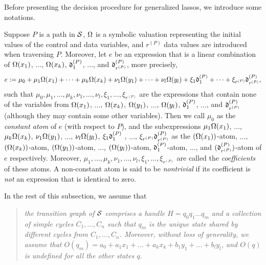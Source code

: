 Before presenting the decision procedure for generalized lassos, we introduce some notations.

Suppose $P$ is a path in ${\mathcal{S} }$, $\Omega$ is a symbolic valuation representing the initial values of the control and data variables, and $r^{(P)}$ data values are introduced when traversing $P$. Moreover, let $e$ be an expression that is a linear combination of $\Omega(x_1)$, $\dots$, $\Omega(x_k)$, $\mathfrak{d}^{(P)}_1$, $\dots$, and $\mathfrak{d}^{(P)}_{r^{(P)}}$, more precisely, 
\[e:=\mu_0 + \mu_1 \Omega(x_1) +\dots + \mu_k \Omega(x_k) + \nu_1 \Omega(y_1)+\dots + \nu_l \Omega(y_l)+ \xi_1 \mathfrak{d}^{(P)}_{1} + \dots + \xi_{r^{(P)}} \mathfrak{d}^{(P)}_{r^{(P)}},\]
 such that $\mu_0,\mu_1,\dots,\mu_k,\nu_1,\dots,\nu_{l}, \xi_1,\dots,\xi_{r^{(P)}}$ are the expressions that contain none of the variables from $\Omega(x_1)$, $\dots$, $\Omega(x_k)$, $\Omega(y_1)$, $\dots$, $\Omega(y_l)$, $\mathfrak{d}^{(P)}_1$, $\dots$, and $\mathfrak{d}^{(P)}_{r^{(P)}}$ (although they may contain some other variables). Then we call $\mu_0$ as the \emph{constant atom} of $e$ (with respect to $P$), and the subexpressions $\mu_1 \Omega(x_1)$, $\dots$, $\mu_k \Omega(x_k)$, $\nu_1 \Omega(y_1)$, $\dots$, $\nu_l \Omega(y_l)$, $\xi_1 \mathfrak{d}^{(P)}_{1}$ , $\dots$,  $\xi_{r^{(P)}} \mathfrak{d}^{(P)}_{r^{(P)}}$ as the $(\Omega(x_1))$-atom, $\dots$, $(\Omega(x_k))$-atom, $(\Omega(y_1))$-atom, $\dots$, $(\Omega(y_l))$-atom, $\mathfrak{d}^{(P)}_{1}$-atom, $\dots$, and $(\mathfrak{d}^{(P)}_{r^{(P)}})$-atom of $e$ respectively. Moreover, $\mu_1, \dots, \mu_k, \nu_1,\dots, \nu_{l}, \xi_1,\dots, \xi_{r^{(P)}}$ are called the \emph{coefficients} of these atoms. A non-constant atom is said to be \emph{nontrivial} if its coefficient is \emph{not} an expression that is identical to zero.

In the rest of this subsection, we assume that 
\begin{quote}
\it the transition graph of ${\mathcal{S} }$ comprises a handle $H=q_0 q_1 \dots q_m$ and a collection of simple cycles $C_1,\dots,C_n$ such that $q_m$ is the unique state shared by different cycles from $C_1,\dots,C_n$. Moreover, without loss of generality, we assume that $O(q_m) = a_0 + a_1 x_1 + \dots + a_k x_k + b_1 y_1 + \dots + b_l y_l$, and $O(q)$ is undefined for all the other states $q$.
\end{quote}

